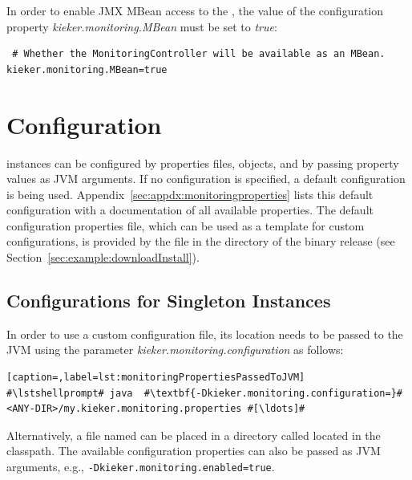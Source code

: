 In order to enable JMX MBean access to the , the value of the %
configuration property \textit{kieker.monitoring.MBean} must be set to \textit{true}:\\

\setPropertiesListing
\begin{lstlisting}
 # Whether the MonitoringController will be available as an MBean.
kieker.monitoring.MBean=true
\end{lstlisting}

\section{\KiekerMonitoringPart{} Configuration}\label{sec:monitoring:configuration}

\KiekerMonitoringPart{} instances can be configured by properties files, %
 objects, and by passing property values as %
JVM arguments. If no configuration is specified, a default %
configuration is being used. %
Appendix~\ref{sec:appdx:monitoringproperties} lists this default %
configuration with a documentation of all available properties. %
The default configuration properties file, which %
can be used as a template for custom configurations, is provided by the file %
\file{\monitoringPropertiesFile} in the directory  of %
the binary release (see Section~\ref{sec:example:downloadInstall}). %


\subsection*{Configurations for Singleton Instances}

In order to use a custom configuration file, its location needs to be passed to %
the JVM using the parameter \textit{kieker.monitoring.configuration} as follows:

\setBashListing
\begin{lstlisting}[caption=,label=lst:monitoringPropertiesPassedToJVM]
#\lstshellprompt# java	#\textbf{-Dkieker.monitoring.configuration=}#<ANY-DIR>/my.kieker.monitoring.properties #[\ldots]#
\end{lstlisting}

\noindent Alternatively, a file named  %
can be placed in a directory called  located in the classpath. %
The available configuration properties can also be passed as JVM %
arguments, e.g., \lstinline{-Dkieker.monitoring.enabled=true}. %

